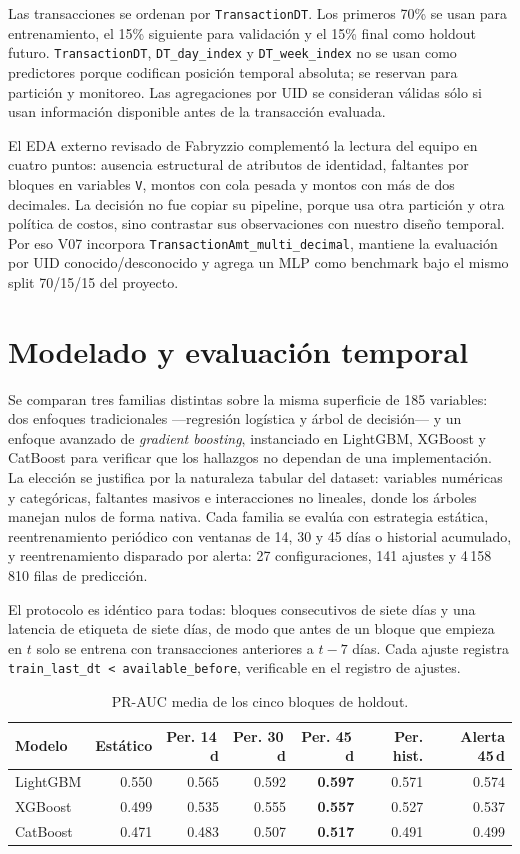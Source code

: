 \documentclass[11pt,letterpaper]{article}
\begin{document}
Las transacciones se ordenan por \texttt{TransactionDT}. Los primeros 70\% se usan para entrenamiento, el 15\% siguiente para validación y el 15\% final como holdout futuro. \texttt{TransactionDT}, \texttt{DT\_day\_index} y \texttt{DT\_week\_index} no se usan como predictores porque codifican posición temporal absoluta; se reservan para partición y monitoreo. Las agregaciones por UID se consideran válidas sólo si usan información disponible antes de la transacción evaluada.

El EDA externo revisado de Fabryzzio complementó la lectura del equipo en cuatro puntos: ausencia estructural de atributos de identidad, faltantes por bloques en variables \texttt{V}, montos con cola pesada y montos con más de dos decimales. La decisión no fue copiar su pipeline, porque usa otra partición y otra política de costos, sino contrastar sus observaciones con nuestro diseño temporal. Por eso V07 incorpora \texttt{TransactionAmt\_multi\_decimal}, mantiene la evaluación por UID conocido/desconocido y agrega un MLP como benchmark bajo el mismo split 70/15/15 del proyecto.

\section{Modelado y evaluación temporal}

Se comparan tres familias distintas sobre la misma superficie de 185 variables: dos enfoques tradicionales —regresión logística y árbol de decisión— y un enfoque avanzado de \emph{gradient boosting}, instanciado en LightGBM, XGBoost y CatBoost para verificar que los hallazgos no dependan de una implementación. La elección se justifica por la naturaleza tabular del dataset: variables numéricas y categóricas, faltantes masivos e interacciones no lineales, donde los árboles manejan nulos de forma nativa. Cada familia se evalúa con estrategia estática, reentrenamiento periódico con ventanas de 14, 30 y 45 días o historial acumulado, y reentrenamiento disparado por alerta: 27 configuraciones, 141 ajustes y 4\,158\,810 filas de predicción.

El protocolo es idéntico para todas: bloques consecutivos de siete días y una latencia de etiqueta de siete días, de modo que antes de un bloque que empieza en $t$ solo se entrena con transacciones anteriores a $t-7$ días. Cada ajuste registra \texttt{train\_last\_dt < available\_before}, verificable en el registro de ajustes.

\begin{table}[H]\centering\small
\begin{tabular}{@{}lrrrrrr@{}}\toprule
Modelo & Estático & Per. 14\,d & Per. 30\,d & Per. 45\,d & Per. hist. & Alerta 45\,d\\\midrule
LightGBM & 0.550 & 0.565 & 0.592 & \textbf{0.597} & 0.571 & 0.574\\
XGBoost & 0.499 & 0.535 & 0.555 & \textbf{0.557} & 0.527 & 0.537\\
CatBoost & 0.471 & 0.483 & 0.507 & \textbf{0.517} & 0.491 & 0.499\\\bottomrule
\end{tabular}
\caption{PR-AUC media de los cinco bloques de holdout.}
\end{table}
\end{document}
